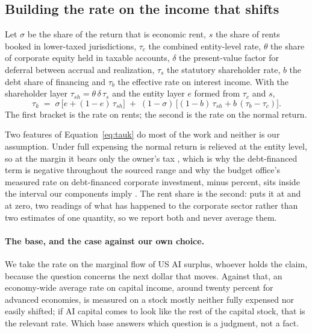 \subsection{Building the rate on the income that shifts}

\begin{definition}
\label{def:tauk}
Let $\sigma$ be the share of the return that is economic rent, $s$ the share of rents booked in
lower-taxed jurisdictions, $\tau_c$ the combined entity-level rate, $\theta$ the share of
corporate equity held in taxable accounts, $\delta$ the present-value factor for deferral between
accrual and realization, $\tau_s$ the statutory shareholder rate, $b$ the debt share of financing
and $\tau_b$ the effective rate on interest income. With the shareholder layer
$\tau_{sh} = \theta\,\delta\,\tau_s$ and the entity layer $e$ formed from $\tau_c$ and $s$,
\begin{equation}
\tau_k \;=\; \sigma\,\bigl[e + (1-e)\,\tau_{sh}\bigr]
\;+\;(1-\sigma)\,\bigl[(1-b)\,\tau_{sh} + b\,(\tau_b - \tau_c)\bigr].
\label{eq:tauk}
\end{equation}
The first bracket is the rate on rents; the second is the rate on the normal return.
\end{definition}

Two features of Equation~\eqref{eq:tauk} do most of the work and neither is our assumption.
Under full expensing the normal return is relieved at the entity level, so at the margin it bears
only the owner's tax \citep{AcemogluManeraRestrepo2020}, which is why the debt-financed term is
negative throughout the sourced range and why the budget office's measured rate on debt-financed
corporate investment, minus  percent, sits inside the interval our
components imply \citep{CBO2014}. The rent share is the second: \citet{Barkai2020} puts it at
 and \citet{KarabarbounisNeiman2014} at zero, two readings of what has happened
to the corporate sector rather than two estimates of one quantity, so we report both and never
average them.

\paragraph{The base, and the case against our own choice.} We take the rate on the marginal flow
of US AI surplus, whoever holds the claim, because the question concerns the next dollar that
moves. Against that, an economy-wide average rate on capital income, around twenty percent for
advanced economies, is measured on a stock mostly neither fully expensed nor easily shifted; if AI
capital comes to look like the rest of the capital stock, that is the relevant rate. Which base
answers which question is a judgment, not a fact.

